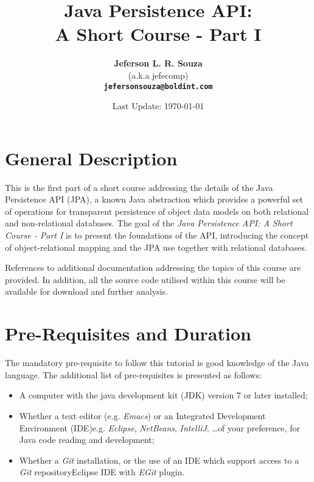 \documentclass[12pt,a4paper]{article}
\begin{document}
\title{\textbf{Java Persistence API: \\ A Short Course - Part I}}

\author{\textbf{Jeferson L. R. Souza} \\ 
(a.k.a jefecomp) \\
\textbf{\texttt{jefersonsouza@boldint.com}}}

\date{Last Update: \today}

\maketitle

\section{General Description}

This is the first part of a short course addressing the details of the Java Persistence API (JPA), a known Java abstraction which provides a powerful set of operations for transparent persistence of object data models on both relational and non-relational databases. The goal of the \textit{Java Persistence API: A Short Course - Part I} is to present the foundations of the API, introducing the concept of object-relational mapping and the JPA use together with relational databases.

References to additional documentation addressing the topics of this course are provided. In addition, all the source code utilised within this course will be available for download and further analysis.

\section{Pre-Requisites and Duration}

The mandatory pre-requisite to follow this tutorial is good knowledge of the Java language. The additional list of pre-requisites is presented as follows:

\begin{itemize}
\itemsep 5pt
\item A computer with the java development kit (JDK) version 7 or later installed;

\item Whether a text editor (e.g. \textit{Emacs}) or an Integrated Development Environment (IDE)\textemdash e.g. \textit{Eclipse}, \textit{NetBeans}, \textit{IntelliJ}, \ldots\textemdash of your preference, for Java code reading and development;

\item Whether a \textit{Git} installation, or the use of an IDE which support access to a \textit{Git} repository\textemdash Eclipse IDE with \textit{EGit} plugin.

\end{itemize}
\end{document}
